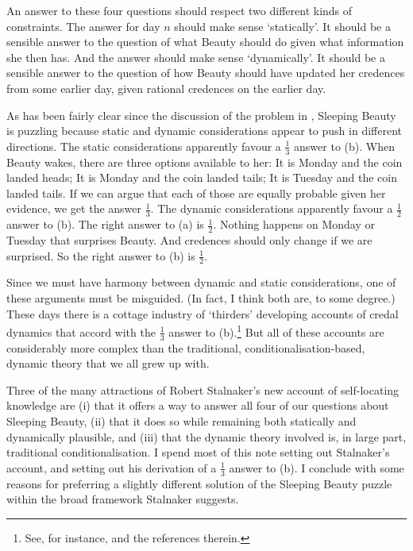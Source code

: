 An answer to these four questions should respect two different kinds of constraints. The answer for day \(n\) should make sense `statically'. It should be a sensible answer to the question of what Beauty should do given what information she then has. And the answer should make sense `dynamically'. It should be a sensible answer to the question of how Beauty should have updated her credences from some earlier day, given rational credences on the earlier day.

As has been fairly clear since the discussion of the problem in \citet{Elga2000}, Sleeping Beauty is puzzling because static and dynamic considerations appear to push in different directions. The static considerations apparently favour a \(\frac{1}{3}\) answer to (b). When Beauty wakes, there are three options available to her: It is Monday and the coin landed heads; It is Monday and the coin landed tails; It is Tuesday and the coin landed tails. If we can argue that each of those are equally probable given her evidence, we get the answer \(\frac{1}{3}\). The dynamic considerations apparently favour a \(\frac{1}{2}\) answer to (b). The right answer to (a) is \(\frac{1}{2}\). Nothing happens on Monday or Tuesday that surprises Beauty. And credences should only change if we are surprised. So the right answer to (b) is \(\frac{1}{2}\).

Since we must have harmony between dynamic and static considerations, one of these arguments must be misguided. (In fact, I think both are, to some degree.) These days there is a cottage industry of `thirders' developing accounts of credal dynamics that accord with the \(\frac{1}{3}\) answer to (b).\footnote{See, for instance, \citet{Titlebaum2008} and the references therein.} But all of these accounts are considerably more complex than the traditional, conditionalisation-based, dynamic theory that we all grew up with. 

Three of the many attractions of Robert Stalnaker's new account of self-locating knowledge are (i) that it offers a way to answer all four of our questions about Sleeping Beauty, (ii) that it does so while remaining both statically and dynamically plausible, and (iii) that the dynamic theory involved is, in large part, traditional conditionalisation. I spend most of this note setting out Stalnaker's account, and setting out his derivation of a \(\frac{1}{3}\) answer to (b). I conclude with some reasons for preferring a slightly different solution of the Sleeping Beauty puzzle within the broad framework Stalnaker suggests.

